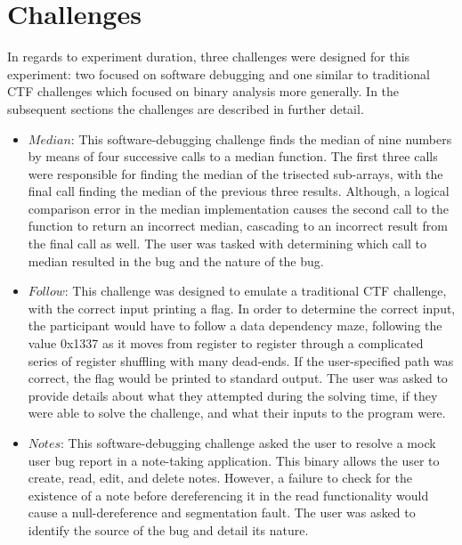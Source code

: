 \section{Challenges}
In regards to experiment duration, three challenges were designed for this experiment: two focused on software debugging and one similar to traditional CTF challenges which focused on binary analysis more generally. In the subsequent sections the challenges are described in further detail.
\begin{itemize}
    \item $Median$: This software-debugging challenge finds the median of nine numbers by means of four successive calls to a median function. The first three calls were responsible for finding the median of the trisected sub-arrays, with the final call finding the median of the previous three results. Although, a logical comparison error in the median implementation causes the second call to the function to return an incorrect median, cascading to an incorrect result from the final call as well. The user was tasked with determining which call to median resulted in the bug and the nature of the bug. 
    \item $Follow$: This challenge was designed to emulate a traditional CTF challenge, with the correct input printing a flag. In order to determine the correct input, the participant would have to follow a data dependency maze, following the value 0x1337 as it moves from register  to register  through a complicated series of register shuffling with many dead-ends. If the user-specified path was correct, the flag would be printed to standard output. The user was asked to provide details about what they attempted during the solving time, if they were able to solve the challenge, and what their inputs to the program were. 
    \item $Notes$: This software-debugging challenge asked the user to resolve a mock user bug report in a note-taking application. This binary allows the user to create, read, edit, and delete notes. However, a failure to check for the existence of a note before dereferencing it in the read functionality would cause a null-dereference and segmentation fault. The user was asked to identify the source of the bug and detail its nature.
\end{itemize}

